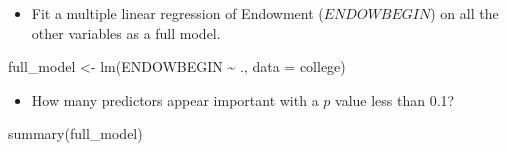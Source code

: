 \documentclass[
  letterpaper,
  DIV=11,
  numbers=noendperiod]{scrartcl}
\newenvironment{Shaded}{\begin{snugshade}}{\end{snugshade}}
\newcommand{\AttributeTok}[1]{\textcolor[rgb]{0.40,0.45,0.13}{#1}}
\newcommand{\FunctionTok}[1]{\textcolor[rgb]{0.28,0.35,0.67}{#1}}
\newcommand{\NormalTok}[1]{\textcolor[rgb]{0.00,0.23,0.31}{#1}}
\newcommand{\OtherTok}[1]{\textcolor[rgb]{0.00,0.23,0.31}{#1}}
\newcommand{\SpecialCharTok}[1]{\textcolor[rgb]{0.37,0.37,0.37}{#1}}
\providecommand{\tightlist}{%
  \setlength{\itemsep}{0pt}\setlength{\parskip}{0pt}}\usepackage{longtable,booktabs,array}
\begin{document}
\begin{itemize}
\tightlist
\item
  Fit a multiple linear regression of Endowment (\(ENDOWBEGIN\)) on all
  the other variables as a full model.
\end{itemize}

\begin{Shaded}
\begin{Highlighting}[]
\NormalTok{full\_model }\OtherTok{\textless{}{-}} \FunctionTok{lm}\NormalTok{(ENDOWBEGIN }\SpecialCharTok{\textasciitilde{}}\NormalTok{ ., }\AttributeTok{data =}\NormalTok{ college)}
\end{Highlighting}
\end{Shaded}

\begin{itemize}
\tightlist
\item
  How many predictors appear important with a \(p\) value less than 0.1?
\end{itemize}

\begin{Shaded}
\begin{Highlighting}[]
\FunctionTok{summary}\NormalTok{(full\_model)}
\end{Highlighting}
\end{Shaded}
\end{document}
